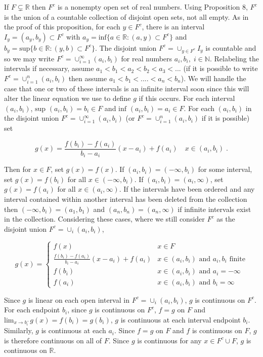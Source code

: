 \documentclass[a4paper]{article}
\begin{document}
If $F \subsetneq \mathbb{R}$ then $F^c$ is a nonempty open set of real numbers. Using Proposition 8, $F^c$ is the union of a countable collection of disjoint open sets, not all empty. As in the proof of this proposition, for each $y \in F^c$, there is an interval $I_y = (a_y,b_y) \subset F^c$ with $a_y = \text{inf}\{a \in \mathbb{R}: (a,y) \subset F^c\}$ and $b_y = \text{sup}\{b \in \mathbb{R}: (y,b) \subset F^c\}$. The disjoint union  $F^c = \cup_{y \in F^c}I_y$ is countable and so we may write $F^c = \cup_{i=1}^{\infty} (a_i,b_i)$ for real numbers $a_i,b_i, \;i \in \mathbb{N}$. Relabeling the intervals if necessary, assume $a_1<b_1<a_2<b_2<a_3<...$ (if it is possible to write $F^c = \cup_{i=1}^{n} (a_i,b_i)$ then assume $a_1<b_1<....<a_n<b_n$). We will handle the case that one or two of these intervals is an infinite interval soon since this will alter the linear equation we use to define $g$ if this occurs. For each interval $(a_i,b_i)$, $\text{sup }(a_i,b_i) = b_i \in F$ and $\text{inf }(a_i,b_i) = a_i \in F$. For each $(a_i,b_i)$ in the disjoint union $F^c = \cup_{i=1}^{\infty} (a_i,b_i)$ (or $F^c = \cup_{i=1}^{n} (a_i,b_i)$ if it is possible) set 

$$g(x) = \frac{f(b_i) - f(a_i)}{b_i-a_i}(x-a_i) + f(a_i) \quad x \in (a_i,b_i) \;.$$

Then for $x \in F$, set $g(x) = f(x)$. If $(a_i, b_i) = (-\infty, b_i)$ for some interval, set $g(x) = f(b_i)$ for all $x \in (-\infty, b_i)$. If $(a_i,b_i) = (a_i,\infty)$, set $g(x) = f(a_i)$ for all $x \in (a_i,\infty)$. If the intervals have been ordered and any interval contained within another interval has been deleted from the collection then $(-\infty,b_i) = (a_1,b_1)$ and $(a_n,b_n) = (a_n,\infty)$ if infinite intervals exist in the collection. Considering these cases, where we still consider $F^c$ as the disjoint union $F^c = \cup_i (a_i,b_i)$, 

$$
g(x) = \begin{cases} f(x) & x \in F\\
 \frac{f(b_i) - f(a_i)}{b_i-a_i}(x-a_i) + f(a_i) & x \in (a_i,b_i) \text{ and } a_i,b_i \text{ finite}\\
 f(b_i) & x \in (a_i,b_i) \text{ and } a_i= - \infty\\
 f(a_i) & x \in (a_i,b_i) \text{ and } b_i = \infty
 \end{cases}
$$

Since $g$ is linear on each open interval in $F^c = \cup_i (a_i,b_i)$, $g$ is continuous on $F^c$. For each endpoint $b_i$, since $g$ is continuous on $F^c$, $f=g$ on $F$ and $\text{lim}_{x\rightarrow b_i^-} g(x) = f(b_i) = g(b_i)$, $g$ is continuous at each interval endpoint $b_i$. Similarly, $g$ is continuous at each $a_i$. Since $f=g$ on $F$ and $f$ is continuous on $F$, $g$ is therefore continuous on all of $F$. Since $g$ is continuous for any $x \in F^c\cup F$, $g$ is continuous on $\mathbb{R}$.  \\
\end{document}

